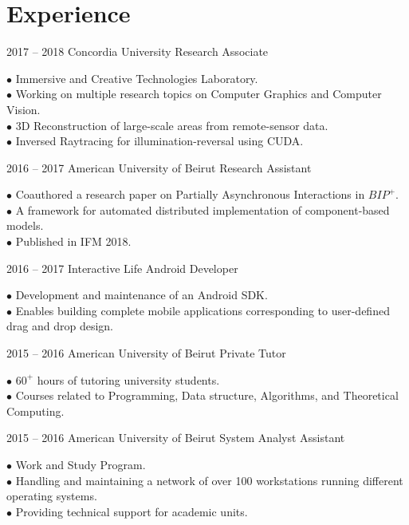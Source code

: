 \documentclass{tccv}
\begin{document}
\section{Experience}
\begin{eventlist}

\item{2017 -- 2018}
     {Concordia University}
     {Research Associate}

$\bullet$ Immersive and Creative Technologies Laboratory.\\
$\bullet$ Working on multiple research topics on Computer Graphics and Computer Vision.\\
$\bullet$ 3D Reconstruction of large-scale areas from remote-sensor data.\\
$\bullet$ Inversed Raytracing for illumination-reversal using CUDA.



\item{2016 -- 2017}
     {American University of Beirut}
     {Research Assistant}

$\bullet$ Coauthored a research paper on Partially Asynchronous Interactions in $BIP^+$.\\
$\bullet$ A framework for automated distributed implementation of component-based models. \\
$\bullet$ Published in IFM 2018.

\item{2016 -- 2017}
     {Interactive Life}
     {Android Developer}

$\bullet$ Development and maintenance of an Android SDK.\\
$\bullet$ Enables building complete mobile applications corresponding to user-defined drag and drop design.

\item{2015 -- 2016}
     {American University of Beirut}
     {Private Tutor}

$\bullet$ $60^+$ hours of tutoring university students.\\
$\bullet$ Courses related to Programming, Data structure, Algorithms, and Theoretical Computing.

\item{2015 -- 2016}
     {American University of Beirut}
     {System Analyst Assistant}

$\bullet$ Work and Study Program.\\
$\bullet$ Handling and maintaining a network of over 100 workstations running different operating systems. \\
$\bullet$ Providing technical support for academic units.


\end{eventlist}
\end{document}
